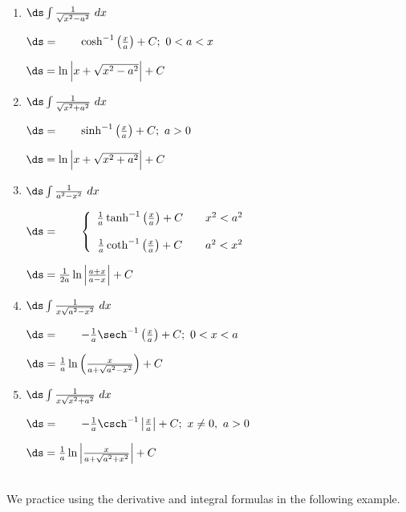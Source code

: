 \setboxwidth{120pt}
\noindent%
\begin{minipage}{\specialboxlength}
{%
\begin{enumerate}
\item \parbox{70pt}{$\ds\int \frac{1}{\sqrt{x^2-a^2}}\ dx$} \parbox{180pt}{$\ds=\qquad \cosh^{-1}\left(\frac xa\right)+C;\ 0<a<x$} $\ds=\ln\Big|x+\sqrt{x^2-a^2}\Big|+C$

\item \parbox{70pt}{$\ds\int \frac{1}{\sqrt{x^2+a^2}}\ dx$} \parbox{180pt}{$\ds=\qquad \sinh^{-1}\left(\frac xa\right)+C;\ a>0$} $\ds=\ln\Big|x+\sqrt{x^2+a^2}\Big|+C$

\item \parbox{70pt}{$\ds\int \frac{1}{a^2-x^2}\ dx$} \parbox{180pt}{$\ds=\qquad \left\{\begin{array}{ccc} \frac1a\tanh^{-1}\left(\frac xa\right)+C & & x^2<a^2 \\ \\
\frac1a\coth^{-1}\left(\frac xa\right)+C & & a^2<x^2 \end{array}\right.$} $\ds=\frac1{2a}\ln\left|\frac{a+x}{a-x}\right|+C$

\item \parbox{70pt}{$\ds\int \frac{1}{x\sqrt{a^2-x^2}}\ dx $} \parbox{180pt}{$\ds=\qquad -\frac1a\sech^{-1}\left(\frac xa\right)+C;\ 0<x<a$} $\ds= \frac1a \ln\left(\frac{x}{a+\sqrt{a^2-x^2}}\right)+C $

\item	\parbox{70pt}{$\ds\int \frac{1}{x\sqrt{x^2+a^2}}\ dx $} \parbox{180pt}{$\ds=\qquad -\frac1a\csch^{-1}\left|\frac xa\right| + C;\ x\neq 0,\ a>0$}$\ds= \frac1a \ln\left|\frac{x}{a+\sqrt{a^2+x^2}}\right|+C $
\end{enumerate}
}
\end{minipage}
\restoreboxwidth
\\

We practice using the derivative and integral formulas in the following example.\\
\clearpage

